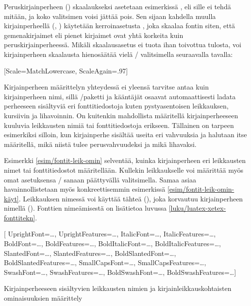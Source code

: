 Peruskirjainperheen () skaalaukseksi asetetaan
esimerkissä , eli sille ei tehdä mitään, ja koko
valitsimen voisi jättää pois. Sen sijaan kahdella muulla
kirjainperheellä (, )
käytetään kerroinasetusta , joka skaalaa fontin
siten, että gemenakirjaimet eli pienet kirjaimet ovat yhtä korkeita kuin
peruskirjainperheessä. Mikäli skaalausasetus  ei
tuota ihan toivottua tulosta, voi kirjainperheen skaalausta hienosäätää
vielä \-/ valitsimella seuraavalla tavalla:

\begin{koodilohkosis}
\setmonofont{TeX Gyre Cursor}
[Scale=MatchLowercase, ScaleAgain=.97]
\end{koodilohkosis}

\noindent
Kirjainperheen määrittelyn yhteydessä ei yleensä tarvitse antaa kuin
kirjainperheen nimi, sillä \-/paketti ja kääntäjät
osaavat automaattisesti ladata perheeseen sisältyviä eri
fonttitiedostoja kuten pystyasentoisen leikkauksen, kursiivin ja
lihavoinnin. On kuitenkin mahdollista määritellä kirjainperheeseen
kuuluvia leikkausten nimiä tai fonttitiedostoja erikseen. Tällainen on
tarpeen esimerkiksi silloin, kun kirjainperhe sisältää useita eri
vahvuuksia ja halutaan itse määritellä, mikä niistä tulee
perusvahvuudeksi ja mikä lihavaksi.

Esimerkki \ref{esim/fontit-leik-omin} selventää, kuinka kirjainperheen
eri leikkausten nimet tai fonttitiedostot määritellään. Kullekin
leikkaukselle voi määrittää myös omat asetuksensa \-/
sanaan päättyvällä valitsimella. Samaa asiaa havainnollistetaan myös
konkreettisemmin esimerkissä \ref{esim/fontit-leik-omin-käyt}.
Leikkauksen nimessä voi käyttää tähteä (\koodi{*}), joka korvautuu
kirjainperheen nimellä (). Fonttien nimeämisestä
on lisätietoa luvussa \ref{luku/luatex-xetex-fonttitekn}.

\begin{esimerkki*}
\begin{koodilohko}
\setmainfont{…}[
  UprightFont={…},     UprightFeatures={…},
  ItalicFont={…},      ItalicFeatures={…},
  BoldFont={…},        BoldFeatures={…},
  BoldItalicFont={…},  BoldItalicFeatures={…},
  SlantedFont={…},     SlantedFeatures={…},
  BoldSlantedFont={…}, BoldSlantedFeatures={…},
  SmallCapsFont={…},   SmallCapsFeatures={…},
  SwashFont={…},       SwashFeatures={…},
  BoldSwashFont={…},   BoldSwashFeatures={…}]
\end{koodilohko}
  \caption{Kirjainperheeseen sisältyvien leikkausten nimien ja
    kirjainleikkauskohtaisten ominaisuuksien määrittely}
  \label{esim/fontit-leik-omin}
\end{esimerkki*}

